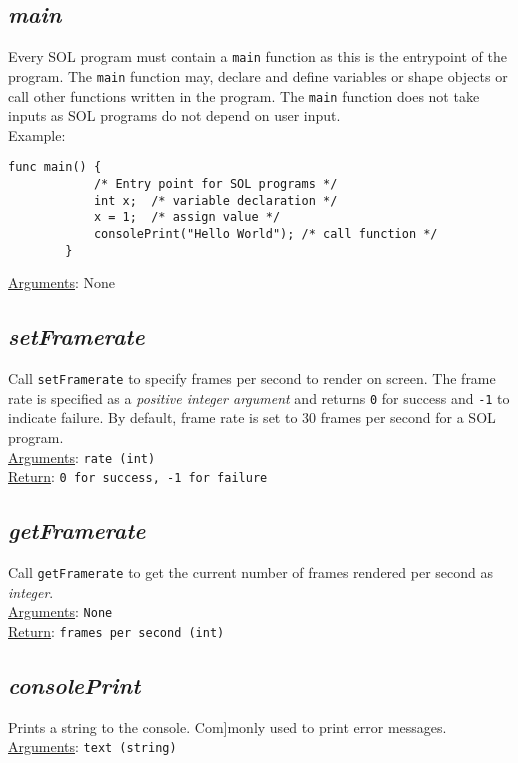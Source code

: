     \subsection{\textit{main}}
    Every SOL program must contain a \texttt{main} function as this is the entrypoint of the program. The \texttt{main} function may, declare and define variables or shape objects or call other functions written in the program. The \texttt{main} function does not take inputs as SOL programs do not depend on user input.\\
    Example:\\
    \begin{lstlisting}[style=sol]
        func main() {
            /* Entry point for SOL programs */
            int x;  /* variable declaration */
            x = 1;  /* assign value */
            consolePrint("Hello World"); /* call function */
        }
    \end{lstlisting}
    \underline{Arguments}: None

    \subsection{\textit{setFramerate}}
    Call \texttt{setFramerate} to specify frames per second to render on screen. The frame rate is specified as a \textit{positive integer argument} and returns \texttt{0} for success and \texttt{-1} to indicate failure. By default, frame rate is set to 30 frames per second for a SOL program.\\
    \underline{Arguments}: \texttt{rate (int)}\\
    \underline{Return}: \texttt{0 for success, -1 for failure}

    \subsection{\textit{getFramerate}}
    Call \texttt{getFramerate} to get the current number of frames rendered per second as \textit{integer}.\\
    \underline{Arguments}: \texttt{None}\\
    \underline{Return}: \texttt{frames per second (int)}

    \subsection{\textit{consolePrint}}
    Prints a string to the console. Com]monly used to print error messages.\\
    \underline{Arguments}: \texttt{text (string)}

